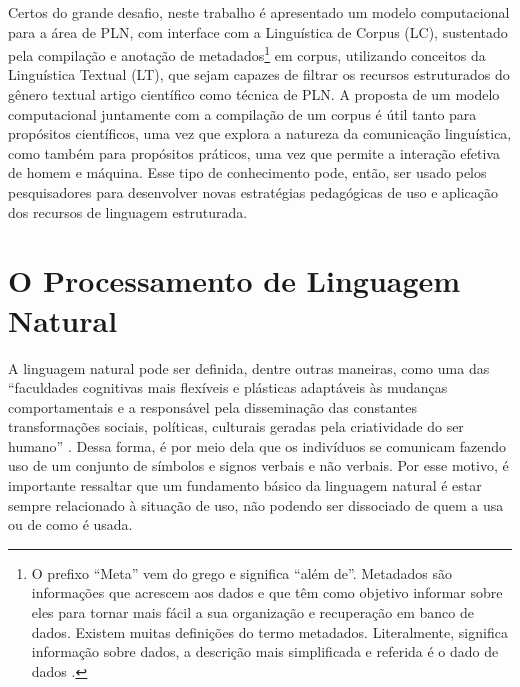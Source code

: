 \documentclass[portuguese]{textolivre}
\begin{document}
Certos do grande desafio, neste trabalho é apresentado um modelo computacional para a área de PLN, com interface com a Linguística de Corpus (LC), sustentado pela compilação e anotação de metadados\footnote{O prefixo “Meta” vem do grego e significa “além de”. Metadados são informações que acrescem aos dados e que têm como objetivo informar sobre eles para tornar mais fácil a sua organização e recuperação em banco de dados. Existem muitas definições do termo metadados. Literalmente, significa informação sobre dados, a descrição mais simplificada e referida é o dado de dados \cite{kucuk_application_2000}.} em corpus, utilizando conceitos da Linguística Textual (LT), que sejam capazes de filtrar os recursos estruturados do gênero textual artigo científico como técnica de PLN. A proposta de um modelo computacional juntamente com a compilação de um corpus é útil tanto para propósitos científicos, uma vez que explora a natureza da comunicação linguística, como também para propósitos práticos, uma vez que permite a interação efetiva de homem e máquina. Esse tipo de conhecimento pode, então, ser usado pelos pesquisadores para desenvolver novas estratégias pedagógicas de uso e aplicação dos recursos de linguagem estruturada.

\section{O Processamento de Linguagem Natural}\label{sec-normas}
A linguagem natural pode ser definida, dentre outras maneiras, como uma das “faculdades cognitivas mais flexíveis e plásticas adaptáveis às mudanças comportamentais e a responsável pela disseminação das constantes transformações sociais, políticas, culturais geradas pela criatividade do ser humano” \cite[p. 7]{marcuschi_generos_2004}. Dessa forma, é por meio dela que os indivíduos se comunicam fazendo uso de um conjunto de símbolos e signos verbais e não verbais. Por esse motivo, é importante ressaltar que um fundamento básico da linguagem natural é estar sempre relacionado à situação de uso, não podendo ser dissociado de quem a usa ou de como é usada.
\end{document}
